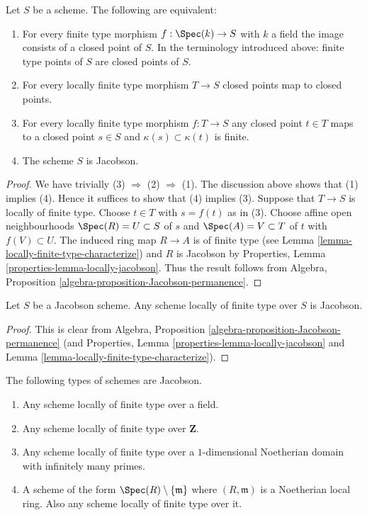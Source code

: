 \begin{lemma}
\label{lemma-jacobson-finite-type-points}
Let $S$ be a scheme.
The following are equivalent:
\begin{enumerate}
\item For every finite type morphism $f : \Spec(k) \to S$
with $k$ a field the image consists of a closed point of $S$.
In the terminology introduced above: finite type points of $S$ are
closed points of $S$.
\item For every locally finite type morphism $T \to S$ closed points map
to closed points.
\item For every locally finite type morphism $f : T \to S$ any closed point
$t \in T$ maps to a closed point $s \in S$ and $\kappa(s) \subset \kappa(t)$
is finite.
\item The scheme $S$ is Jacobson.
\end{enumerate}
\end{lemma}

\begin{proof}
We have trivially (3) $\Rightarrow$ (2) $\Rightarrow$ (1).
The discussion above shows that (1) implies (4).
Hence it suffices to show that (4) implies (3).
Suppose that $T \to S$ is locally of finite type.
Choose $t \in T$ with $s = f(t)$ as in (3).
Choose affine open neighbourhoods $\Spec(R) = U \subset S$ of $s$ and
$\Spec(A) = V \subset T$ of $t$ with $f(V) \subset U$.
The induced ring map $R \to A$ is of finite type
(see Lemma \ref{lemma-locally-finite-type-characterize}) and $R$ is Jacobson
by Properties, Lemma \ref{properties-lemma-locally-jacobson}.
Thus the result follows from
Algebra, Proposition \ref{algebra-proposition-Jacobson-permanence}.
\end{proof}

\begin{lemma}
\label{lemma-Jacobson-universally-Jacobson}
Let $S$ be a Jacobson scheme.
Any scheme locally of finite type over $S$ is Jacobson.
\end{lemma}

\begin{proof}
This is clear from
Algebra, Proposition \ref{algebra-proposition-Jacobson-permanence}
(and Properties, Lemma \ref{properties-lemma-locally-jacobson} and
Lemma \ref{lemma-locally-finite-type-characterize}).
\end{proof}

\begin{lemma}
\label{lemma-ubiquity-Jacobson-schemes}
The following types of schemes are Jacobson.
\begin{enumerate}
\item Any scheme locally of finite type over a field.
\item Any scheme locally of finite type over $\mathbf{Z}$.
\item Any scheme locally of finite type over a $1$-dimensional
Noetherian domain with infinitely many primes.
\item A scheme of the form $\Spec(R) \setminus \{\mathfrak m\}$
where $(R, \mathfrak m)$ is a Noetherian local ring.
Also any scheme locally of finite type over it.
\end{enumerate}
\end{lemma}

